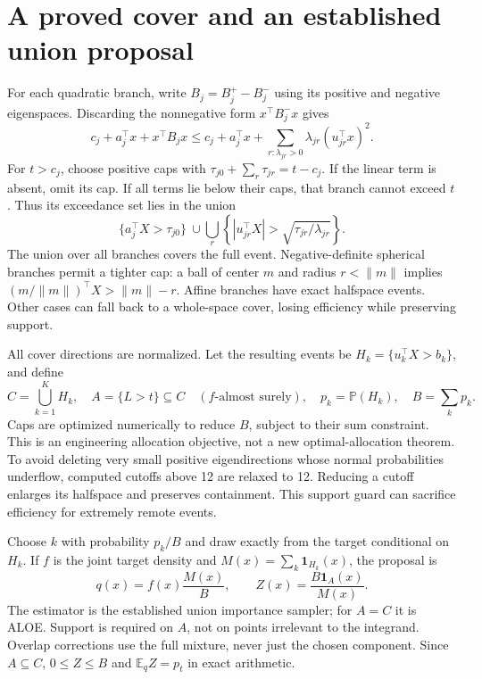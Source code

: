 \documentclass[11pt]{article}
\newcommand{\E}{\mathbb E}
\newcommand{\Pp}{\mathbb P}
\newcommand{\ind}{\mathbf 1}
\begin{document}
\section{A proved cover and an established union proposal}
For each quadratic branch, write $ B_j=B_j^+-B_j^-$ using its positive and negative eigenspaces. Discarding the nonnegative form $ x^\top B_j^-x $ gives
\begin{equation}
 c_j+a_j^\top x+x^\top B_jx
 \le c_j+a_j^\top x+\sum_{r:\lambda_{jr}>0}\lambda_{jr}(u_{jr}^\top x)^2.
\end{equation}
For $ t>c_j $, choose positive caps with $\tau_{j 0}+\sum_r\tau_{jr}=t-c_j $. If the linear term is absent, omit its cap. If all terms lie below their caps, that branch cannot exceed $ t $. Thus its exceedance set lies in the union
\begin{equation}
 \{a_j^\top X>\tau_{j 0}\}\ \cup\!
 \bigcup_r\left\{|u_{jr}^\top X|>\sqrt{\tau_{jr}/\lambda_{jr}}\right\}.
 \label{eq:cover}
\end{equation}
The union over all branches covers the full event. Negative-definite spherical branches permit a tighter cap: a ball of center $ m $ and radius $ r<\|m\|$ implies $(m/\|m\|)^\top X>\|m\|-r $. Affine branches have exact halfspace events. Other cases can fall back to a whole-space cover, losing efficiency while preserving support.

All cover directions are normalized. Let the resulting events be $ H_k=\{u_k^\top X>b_k\}$, and define
\begin{equation}
 C=\bigcup_{k=1}^K H_k,\quad A=\{L>t\}\subseteq C\quad(f\text{-almost surely}),\quad
 p_k=\Pp(H_k),\quad B=\sum_kp_k.
\end{equation}
Caps are optimized numerically to reduce $ B $, subject to their sum constraint. This is an engineering allocation objective, not a new optimal-allocation theorem. To avoid deleting very small positive eigendirections whose normal probabilities underflow, computed cutoffs above 12 are relaxed to 12. Reducing a cutoff enlarges its halfspace and preserves containment. This support guard can sacrifice efficiency for extremely remote events.

Choose $ k $ with probability $ p_k/B $ and draw exactly from the target conditional on $ H_k $. If $ f $ is the joint target density and $ M(x)=\sum_k\ind_{H_k}(x)$, the proposal is
\begin{equation}
 q(x)=f(x)\frac{M(x)}B,
 \qquad Z(x)=\frac{B\ind_A(x)}{M(x)}.
 \label{eq:union}
\end{equation}
The estimator is the established union importance sampler; for $ A=C $ it is ALOE. Support is required on $ A $, not on points irrelevant to the integrand. Overlap corrections use the full mixture, never just the chosen component. Since $ A\subseteq C $, $0\le Z\le B $ and $\E_qZ=p_t $ in exact arithmetic.
\end{document}
